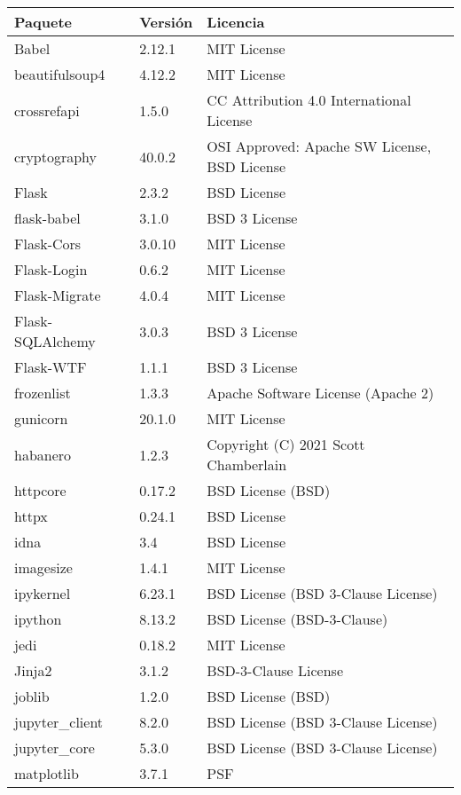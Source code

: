\begin{table}[h]
\centering
\begin{tabular}{|l|l|l|}
\hline
\textbf{Paquete} & \textbf{Versión}& \textbf{Licencia} \\ \hline
Babel & 2.12.1 &  MIT License \\ \hline
beautifulsoup4 & 4.12.2 & MIT License \\ \hline
crossrefapi & 1.5.0 &  CC Attribution 4.0 International License \\ \hline
cryptography & 40.0.2 &  OSI Approved: Apache SW License, BSD License \\ \hline
Flask & 2.3.2 &  BSD License \\ \hline
flask-babel & 3.1.0 &  BSD 3 License \\ \hline
Flask-Cors & 3.0.10 &  MIT License \\ \hline
Flask-Login & 0.6.2 &  MIT License \\ \hline
Flask-Migrate & 4.0.4 &  MIT License \\ \hline
Flask-SQLAlchemy & 3.0.3 & BSD 3 License \\ \hline
Flask-WTF & 1.1.1 &  BSD 3 License \\ \hline
frozenlist & 1.3.3 &  Apache Software License (Apache 2) \\ \hline
gunicorn & 20.1.0 &  MIT License \\ \hline
habanero & 1.2.3 & Copyright (C) 2021 Scott Chamberlain \\ \hline
httpcore & 0.17.2 &  BSD License (BSD) \\ \hline
httpx & 0.24.1 &  BSD License \\ \hline
idna & 3.4 &  BSD License \\ \hline
imagesize & 1.4.1 &  MIT License \\ \hline
ipykernel & 6.23.1 &  BSD License (BSD 3-Clause License) \\ \hline
ipython & 8.13.2 &  BSD License (BSD-3-Clause) \\ \hline
jedi & 0.18.2 &  MIT License \\ \hline
Jinja2 & 3.1.2 &  BSD-3-Clause License \\ \hline
joblib & 1.2.0 &  BSD License (BSD) \\ \hline
jupyter\_client & 8.2.0 & BSD License (BSD 3-Clause License) \\ \hline
jupyter\_core & 5.3.0 & BSD License (BSD 3-Clause License) \\ \hline
matplotlib & 3.7.1 & PSF \\ \hline

\end{tabular}
\end{table}
